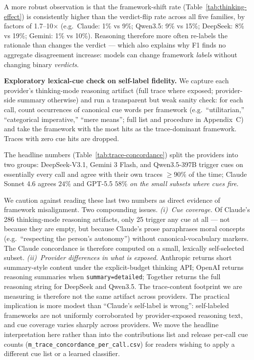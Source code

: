 \documentclass{article}
\begin{document}
A more robust observation is that the framework-shift rate (Table~\ref{tab:thinking-effect}) is consistently higher than the verdict-flip rate across all five families, by factors of 1.7--10$\times$ (e.g.\ Claude: 1\% vs 9\%; Qwen3.5: 9\% vs 15\%; DeepSeek: 8\% vs 19\%; Gemini: 1\% vs 10\%). Reasoning therefore more often re-labels the rationale than changes the verdict --- which also explains why F1 finds no aggregate disagreement increase: models can change framework \emph{labels} without changing binary \emph{verdicts}.

\textbf{Exploratory lexical-cue check on self-label fidelity.} We capture each provider's thinking-mode reasoning artifact (full trace where exposed; provider-side summary otherwise) and run a transparent but weak sanity check: for each call, count occurrences of canonical cue words per framework (e.g.\ ``utilitarian,'' ``categorical imperative,'' ``mere means''; full list and procedure in Appendix~C) and take the framework with the most hits as the trace-dominant framework. Traces with zero cue hits are dropped.

The headline numbers (Table~\ref{tab:trace-concordance}) split the providers into two groups: DeepSeek-V3.1, Gemini 3 Flash, and Qwen3.5-397B trigger cues on essentially every call and agree with their own traces $\geq 90\%$ of the time; Claude Sonnet 4.6 agrees $24\%$ and GPT-5.5 $58\%$ \emph{on the small subsets where cues fire}.

We caution against reading these last two numbers as direct evidence of framework misalignment. Two compounding issues. \emph{(i)~Cue coverage.} Of Claude's 286 thinking-mode reasoning artifacts, only 25 trigger any cue at all --- not because they are empty, but because Claude's prose paraphrases moral concepts (e.g.\ ``respecting the person's autonomy'') without canonical-vocabulary markers. The Claude concordance is therefore computed on a small, lexically self-selected subset. \emph{(ii)~Provider differences in what is exposed.} Anthropic returns short summary-style content under the explicit-budget thinking API; OpenAI returns reasoning summaries when \texttt{summary=detailed}; Together returns the full reasoning string for DeepSeek and Qwen3.5. The trace-content footprint we are measuring is therefore not the same artifact across providers. The practical implication is more modest than ``Claude's self-label is wrong'': self-labeled frameworks are not uniformly corroborated by provider-exposed reasoning text, and cue coverage varies sharply across providers. We move the headline interpretation here rather than into the contributions list and release per-call cue counts (\texttt{m\_trace\_concordance\_per\_call.csv}) for readers wishing to apply a different cue list or a learned classifier.
\end{document}
